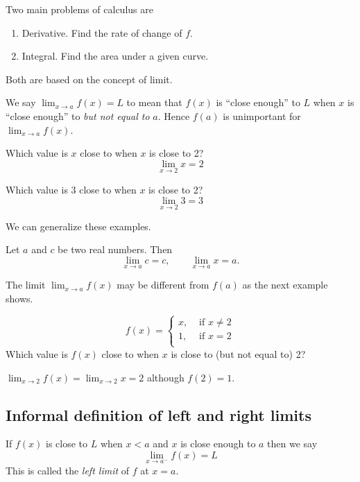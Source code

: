 \documentclass[../main.tex]{subfiles}
\begin{document}
  Two main problems of calculus are
  \begin{enumerate}
    \item Derivative. Find the rate of change of $f$.
    \item Integral. Find the area under a given curve.
  \end{enumerate}
  Both are based on the concept of limit.

  We say $\lim_{x \to a} f(x) = L$ to mean that $f(x)$ is ``close enough'' to $L$ when $x$ is ``close enough'' to \emph{but not equal to} $a$. Hence $f(a)$ is unimportant for $\lim_{x \to a} f(x)$.

  \begin{example}
    Which value is $x$ close to when $x$ is close to 2?
    \[
      \lim_{x \to 2} x = 2
    \]
  \end{example}

  \begin{example}
    Which value is 3 close to when $x$ is close to 2?
    \[
      \lim_{x \to 2} 3 = 3
    \]
  \end{example}

  We can generalize these examples.
  \begin{theorem}
    \label{basic limit theorems}
    Let $a$ and $c$ be two real numbers. Then
    \[
      \lim_{x \to a} c = c, \qquad
      \lim_{x \to a} x = a.
    \]
  \end{theorem}


  The limit $\lim_{x \to a} f(x)$ may be different from $f(a)$ as the next example shows.
  \begin{example}
    \[
      f(x) =
      \begin{cases}
        x, &\text{ if } x\neq 2\\
        1, &\text{ if } x = 2\\
      \end{cases}
    \]
    Which value is $f(x)$ close to when $x$ is close to (but not equal to) 2?

    $\lim_{x \to 2} f(x) = \lim_{x \to 2} x = 2$ although $f(2) = 1$.
  \end{example}

  \subsection*{Informal definition of left and right limits}
  If $f(x)$ is close to $L$ when $x<a$ and $x$ is close enough to $a$ then we say
  \[
    \lim_{x \to a^{-}} f(x) = L
  \]
  This is called the \emph{left limit} of $f$ at $x=a$.
\end{document}
